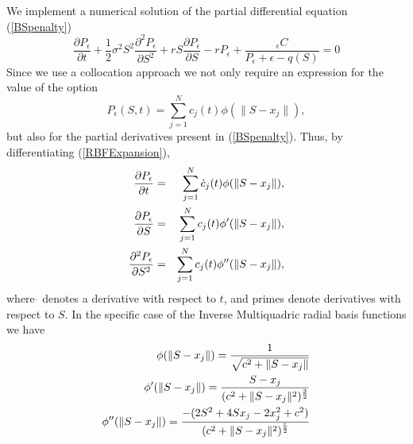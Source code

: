 \documentclass[12pt]{article}
\numberwithin{equation}{section} %
\begin{document}
We implement a numerical solution of the partial differential
equation (\ref{BSpenalty})
$$
\frac{\partial P_\epsilon}{\partial
t}+\frac{1}{2}\sigma^2S^2\frac{\partial^2 P_\epsilon}{\partial S^2}
+rS\frac{\partial P_\epsilon}{\partial
S}-rP_\epsilon+\frac{_\epsilon C }{P_\epsilon + \epsilon - q(S)}=0
$$
Since we use a collocation approach we not only require an
expression for the value of the option
\begin{equation}\label{RBFExpansion}
P_\epsilon (S,t) = \sum_{j=1}^N c_j(t) \phi(\|S-x_j\|),
\end{equation}
but also for the partial derivatives present in (\ref{BSpenalty}).
Thus, by differentiating (\ref{RBFExpansion}),
\begin{eqnarray*}
\frac{\partial P_\epsilon}{\partial t} & = & \sum_{j=1}^N
\dot{c}_j(t) \phi(\|S-x_j\|), \cr \frac{\partial
P_\epsilon}{\partial S} & = & \sum_{j=1}^N c_j(t) \phi'(\|S-x_j\|),
\cr \frac{\partial^{2} P_\epsilon}{\partial S^{2}} & = &
\sum_{j=1}^N c_j(t) \phi''(\|S-x_j\|),
\end{eqnarray*}
where $\dot{}$ denotes a derivative with respect to $t$, and primes
denote derivatives with respect to $S$. In the specific case of the
Inverse Multiquadric radial basis functions we have\cite{Fas02}
\begin{eqnarray*}
\phi(\|S-x_j\|)= \frac{1}{\sqrt{c^2+\|S-x_j\|}}\\ \vspace{10mm}
\phi'(\|S-x_j\|)=\frac{S-x_j}{(c^2+\|S-x_j\|^2)^\frac{3}{2}}\\\vspace{10mm}
\phi''(\|S-x_j\|)=\frac{-(2S^2+4Sx_j-2x_j^2+c^2)}{(c^2+\|S-x_j\|^2)^\frac{5}{2}}
\end{eqnarray*}
\end{document}
